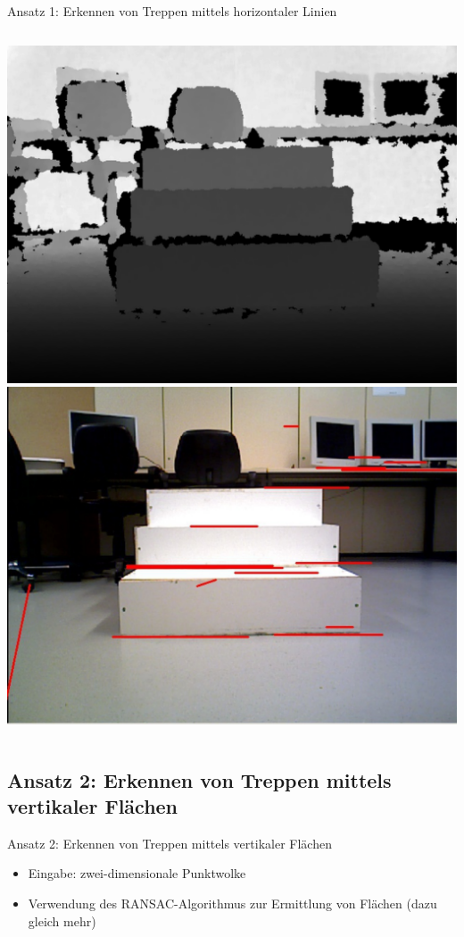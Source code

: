 \documentclass[18pt]{beamer}
\begin{document}
\begin{frame}{Ansatz 1: Erkennen von Treppen mittels horizontaler Linien}
\begin{columns}
	\includegraphics[scale=0.16]{images/canny01.pdf}\newline
	\includegraphics[scale=0.16]{images/canny03.pdf}
\end{columns}
\end{frame}


\subsection{Ansatz 2: Erkennen von Treppen mittels vertikaler Flächen}
\begin{frame}{Ansatz 2: Erkennen von Treppen mittels vertikaler Flächen}
\begin{itemize}
	\item Eingabe: zwei-dimensionale Punktwolke
	\item Verwendung des RANSAC-Algorithmus zur Ermittlung von Flächen (dazu gleich mehr)
\end{itemize}
\end{frame}
\end{document}
